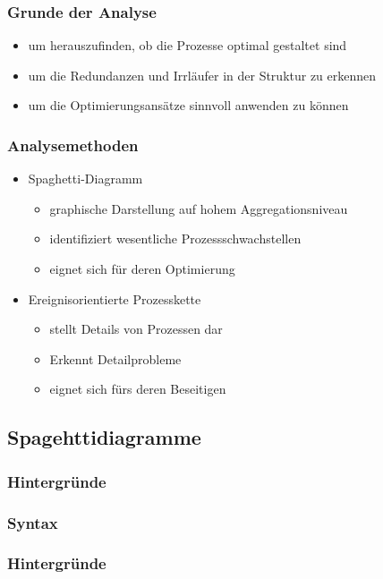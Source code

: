\documentclass{beamer}
\begin{document}
  \begin{frame}
    \frametitle{Grunde der Analyse}
 	 \begin{itemize}
  		\item um herauszufinden, ob die Prozesse optimal gestaltet sind 
  		\item um die Redundanzen und Irrläufer in der Struktur zu erkennen 
  		\item um die Optimierungsansätze sinnvoll anwenden zu können
  	\end{itemize}
  \end{frame}

 
 \begin{frame}
  \frametitle{Analysemethoden}
  
  \begin{itemize}
 	 \item Spaghetti-Diagramm
 	 \begin{itemize}
 	 	\item graphische Darstellung auf hohem Aggregationsniveau
 	 	\item identifiziert wesentliche Prozessschwachstellen
 	 	\item eignet sich für deren Optimierung
 	 \end{itemize}
 	 \bigskip
  	\item Ereignisorientierte Prozesskette
  	\begin{itemize}
 	 	\item stellt Details von Prozessen dar
 	 	\item Erkennt Detailprobleme
 	 	\item eignet sich fürs deren Beseitigen
 	 \end{itemize}
  	
  \end{itemize}
  
   
 \end{frame}

 \subsection[Spaghettidiagramme]{Spagehttidiagramme}
 \begin{frame}
  \frametitle{Hintergründe}

 \end{frame}

 \subsubsection[Syntax]{Syntax}
 \begin{frame}
  \frametitle{Hintergründe}

 \end{frame}
\end{document}
